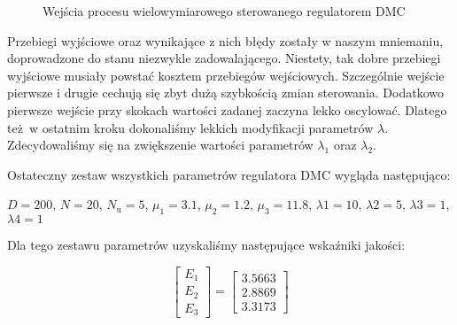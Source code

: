 \begin{figure}
    \begin{subfigure}[b]{\textwidth}
        \centering
    \end{subfigure}
    \caption{Wejścia procesu wielowymiarowego sterowanego regulatorem DMC}
    \label{pro_dmc_2_in}
\end{figure}
\FloatBarrier

Przebiegi wyjściowe oraz wynikające z nich błędy zostały w naszym mniemaniu,
doprowadzone do stanu niezwykle zadowalającego. Niestety, tak dobre przebiegi wyjściowe 
musiały powstać kosztem przebiegów wejściowych. Szczególnie wejście pierwsze i drugie cechują się
zbyt dużą szybkością zmian sterowania. Dodatkowo pierwsze wejście przy skokach wartości zadanej
zaczyna lekko oscylować. Dlatego też w ostatnim kroku dokonaliśmy lekkich modyfikacji 
parametrów $\lambda$. Zdecydowaliśmy się na zwiększenie wartości parametrów $\lambda_{1}$ oraz $\lambda_{2}$.

Ostateczny zestaw wszystkich parametrów regulatora DMC wygląda następująco:


\begin{center}
    $D = \num{200}$, $N = \num{20}$, $N_{\mathrm{u}} = \num{5}$,
    $\mu_{1} = \num{3.1}$, $\mu_{2} = \num{1.2}$, $\mu_{3} = \num{11.8}$,
    $\lambda{1} = \num{10}$, $\lambda{2} = \num{5}$, $\lambda{3} = \num{1}$, $\lambda{4} = \num{1}$
\end{center}

Dla tego zestawu parametrów uzyskaliśmy następujące wskaźniki jakości:

\[
\begin{bmatrix}
    E_{\mathrm{1}} \\
    E_{\mathrm{2}} \\
    E_{\mathrm{3}} 
\end{bmatrix}
= 
\begin{bmatrix}
    \num{3.5663} \\
    \num{2.8869} \\
    \num{3.3173}
\end{bmatrix}
\]

